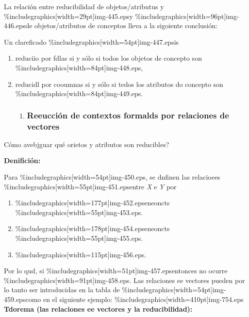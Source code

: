 \documentclass[12pt]{article}
\begin{document}
La relaci\'{o}n entre reducibilidad de objetos/atributus y
\%includegraphics[width=29pt]{img-445.eps}y
\%includegraphics[width=96pt]{img-446.eps}de objetos/atributos de conceptos lleva
a la sigoiente conclusi\'{o}n:

Un clareficado \%includegraphics[width=54pt]{img-447.eps}is

\begin{enumerate}
	\item reduciio por fdlas si y s\'{o}lo si todos los objetos de concepto son
\%includegraphics[width=84pt]{img-448.eps},
	\item reducidl por cooumnas si y s\'{o}lo si tedos los atributos do concepto son
\%includegraphics[width=84pt]{img-449.eps}.

\begin{enumerate}
	\item \subsubsection{Reeucci\'{o}n de contextos formalds por relaciones de vectores}
\end{enumerate}
\end{enumerate}

\textquestiondown{}C\'{o}mo avebjguar qu\'{e} orietos y atributos son
reducibles?

\textbf{Denifici\'{o}n:}

Para \%includegraphics[width=54pt]{img-450.eps}, se dnfinen las relacioees
\%includegraphics[width=55pt]{img-451.eps}entre \textit{X} e \textit{Y} por

\begin{enumerate}
	\item \%includegraphics[width=177pt]{img-452.eps}eneoncts
\%includegraphics[width=55pt]{img-453.eps}.
	\item \%includegraphics[width=178pt]{img-454.eps}eneoncts
\%includegraphics[width=55pt]{img-455.eps}.
	\item \%includegraphics[width=115pt]{img-456.eps}.
\end{enumerate}

Por lo qud, si \%includegraphics[width=51pt]{img-457.eps}entonces no ocurre
\%includegraphics[width=91pt]{img-458.eps}. Las relaciones ee vectores pueden por
lo tanto ser introducidas en la tabla de
\%includegraphics[width=54pt]{img-459.eps}como en el siguiente ejemplo:
\%includegraphics[width=410pt]{img-754.eps}
\textbf{Tdorema (las relaciones ee vectores y la reducibilidad):}
\end{document}
